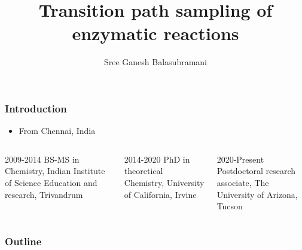 \documentclass{beamer}
\title[TPS free energies]{Transition path sampling of enzymatic reactions}
\author[Schwartz Group]{Sree Ganesh Balasubramani}
\institute[U of A]{Schwartz Group \\ Chemistry and Biochemistry } %
\date{}
\begin{document}
\begin{frame}
  \titlepage
\end{frame}
\begin{frame}
\frametitle{Introduction}
\begin{itemize}
\item From Chennai, India
\end{itemize}
\pause
\begin{columns}
\begin{column}{0.32\textwidth}
    \begin{block}{2009-2014}
    BS-MS in Chemistry, Indian Institute of Science Education and research, Trivandrum
        \end{block}
    \end{column}
    \pause
    \begin{column}{0.32\textwidth}
    \begin{block}{2014-2020}
        PhD in theoretical Chemistry, University of California, Irvine\newline
        \end{block}
    \end{column}
    \pause
\begin{column}{0.32\textwidth}
        \begin{block}{2020-Present}
        Postdoctoral research associate, The University of Arizona, Tucson
        \end{block}
    \end{column}
\end{columns}  
\end{frame}
%
\begin{frame}
  \frametitle{Outline}
  \pause
\end{frame}
\end{document}
